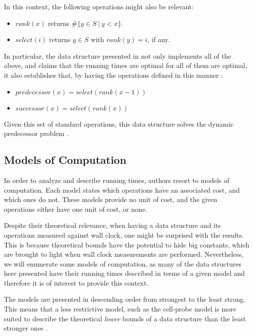 In this context, the following operations might also be relevant:
\begin{itemize}
    \item
    $rank(x)$ returns $\#\{ y \in S\ |\ y < x\}$.
    \item
    $select(i)$ returns $y \in S$ with $rank(y) = i$, if any.
\end{itemize}

In particular, the data structure presented in \cite{patrascu2014dynamic} not only implements all of the above, and claims that the running times are optimal for all of them are optimal, it also establishes that, by having the operations defined in this manner \cite{patrascu2014dynamic}:
\begin{itemize}
    \item
    $predecessor(x) = select(rank(x - 1))$
    \item
    $successor(x) = select(rank(x))$
\end{itemize}

Given this set of standard operations, this data structure solves the dynamic predecessor problem \cite{beame1999optimal}.

\subsection{Models of Computation}\label{sec:modelsofcomputation}

In order to analyze and describe running times, authors resort to models of computation. Each model states which operations have an associated cost, and which ones do not.
These models provide no unit of cost, and the given operations either have one unit of cost, or none.

Despite their theoretical relevance, when having a data structure and its operations measured against wall clock, one might be surprised with the results.
This is because theoretical bounds have the potential to hide big constants, which are brought to light when wall clock measurements are performed.
Nevertheless, we will enumerate some models of computation, as many of the data structures here presented have their running times described in terms of a given model and therefore it is of interest to provide this context.

The models are presented in descending order from strongest to the least strong. This means that a less restrictive model, such as the cell-probe model is more suited to describe the theoretical \emph{lower} bounds of a data structure than the least stronger ones \cite{erikdemainelec11}.

